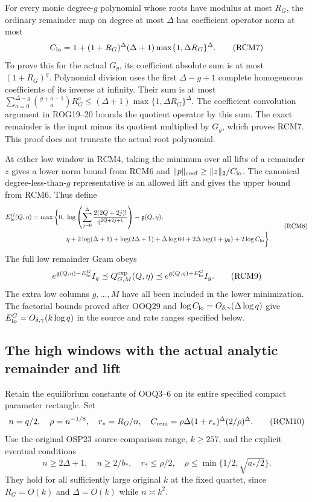 \documentclass[11pt,a4paper]{article}
\begin{document}
For every monic degree-$g$ polynomial whose roots have modulus
at most $R_G$, the ordinary remainder map on degree at most
$\Delta$ has coefficient operator norm at most
\[
 C_{\rm lo}=1+(1+R_G)^\Delta(\Delta+1)
                         \max\{1,\Delta R_G\}^{\Delta}.
 \tag{RCM7}
\]
To prove this for the actual $G_y$, its coefficient absolute sum
is at most $(1+R_G)^g$. Polynomial division uses the first
$\Delta-g+1$ complete homogeneous coefficients of its inverse
at infinity. Their sum is at most
$\sum_{a=0}^{\Delta-g}\binom{g+a-1}{a}R_G^a
 \le(\Delta+1)\max\{1,\Delta R_G\}^{\Delta}$.
The coefficient convolution argument in ROG19--20 bounds the
quotient operator by this sum. The exact remainder is the input
minus its quotient multiplied by $G_y$, which proves RCM7.
This proof does not truncate the actual root polynomial.

At either low window in RCM4, taking the minimum over all
lifts of a remainder $z$ gives a lower norm bound from RCM6
and $\|p\|_{\rm coef}\ge\|z\|_2/C_{\rm lo}$.
The canonical degree-less-than-$g$ representative is an allowed
lift and gives the upper bound from RCM6. Thus define
\[
 \begin{split}
 E_{\rm lo}^G(Q,\eta)=\max\bigg\{0,\ &
 \log\left(\sum_{j=0}^{\Delta}
          \frac{2(2Q+2j)!}{\eta^{2Q+2j+1}}\right)-\mathfrak g(Q,\eta),\\
 &\eta+2\log(\Delta+1)+\log(2\Delta+1)+\Delta\log64
       +2\Delta\log(1+y_0)+2\log C_{\rm lo}\bigg\}.
 \end{split}\tag{RCM8}
\]
The full low remainder Gram obeys
\[
 e^{\mathfrak g(Q,\eta)-E_{\rm lo}^G}I_g
 \preceq Q_{G,M}^{\exp}(Q,\eta)
 \preceq e^{\mathfrak g(Q,\eta)+E_{\rm lo}^G}I_g.
 \tag{RCM9}
\]
The extra low columns $g,\ldots,M$ have all been included
in the lower minimization. The factorial bounds proved after
OOQ29 and $\log C_{\rm lo}=O_{\delta,\gamma}(\Delta\log q)$
give $E_{\rm lo}^G=O_{\delta,\gamma}(k\log q)$ in the
source and rate ranges specified below.

\subsection{The high windows with the actual analytic remainder and lift}

Retain the equilibrium constants of OOQ3--6 on its entire
specified compact parameter rectangle. Set
\[
 n=q/2,\quad\rho=n^{-1/8},\quad r_*=R_G/n,\quad
 C_{\rm rem}=\rho\Delta(1+r_*)^\Delta(2/\rho)^\Delta.
 \tag{RCM10}
\]
Use the original OSP23 source-comparison range, $k\ge257$,
and the explicit eventual conditions
\[
 n\ge2\Delta+1,\quad n\ge2/b_*,\quad r_*\le\rho/2,
 \quad\rho\le\min\{1/2,\sqrt{a_*/2}\}.
 \tag{RCM11}
\]
They hold for all sufficiently large original $k$ at the fixed
quartet, since $R_G=O(k)$ and $\Delta=O(k)$ while $n\asymp k^2$.
\end{document}
